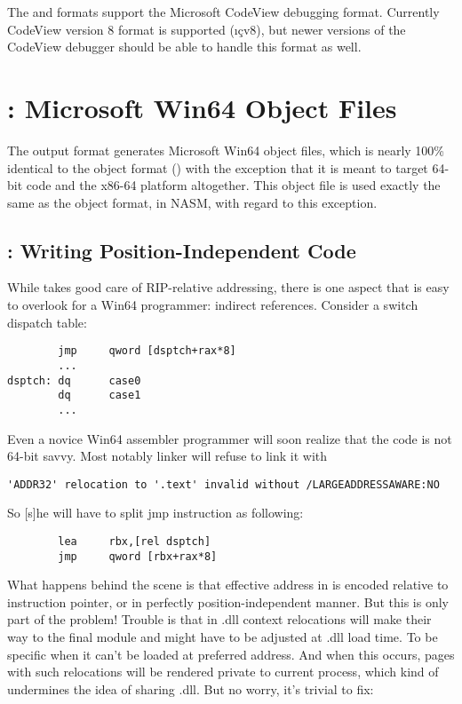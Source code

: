 The  and  formats support the Microsoft CodeView
debugging format. Currently CodeView version 8 format is supported
(\i\c{cv8}), but newer versions of the CodeView debugger should be
able to handle this format as well.

\section{: Microsoft Win64 Object Files}
\label{sec:win64fmt}

The  output format generates Microsoft Win64 object files,
which is nearly 100\% identical to the  object format
() with the exception that it is meant to target
64-bit code and the x86-64 platform altogether. This object file is used
exactly the same as the  object format, in NASM, with regard to this exception.

\subsection{: Writing Position-Independent Code}
\label{subsec:win64pic}

While  takes good care of RIP-relative addressing, there is one
aspect that is easy to overlook for a Win64 programmer: indirect
references. Consider a switch dispatch table:

\begin{lstlisting}
        jmp     qword [dsptch+rax*8]
        ...
dsptch: dq      case0
        dq      case1
        ...
\end{lstlisting}

Even a novice Win64 assembler programmer will soon realize that the code
is not 64-bit savvy. Most notably linker will refuse to link it with

\begin{lstlisting}
'ADDR32' relocation to '.text' invalid without /LARGEADDRESSAWARE:NO
\end{lstlisting}

So [s]he will have to split jmp instruction as following:

\begin{lstlisting}
        lea     rbx,[rel dsptch]
        jmp     qword [rbx+rax*8]
\end{lstlisting}

What happens behind the scene is that effective address in  is
encoded relative to instruction pointer, or in perfectly position-independent
manner. But this is only part of the problem! Trouble is that in .dll context
 relocations will make their way to the final module and might
have to be adjusted at .dll load time. To be specific when it can't be loaded
at preferred address. And when this occurs, pages with such relocations will
be rendered private to current process, which kind of undermines the idea
of sharing .dll. But no worry, it's trivial to fix:

